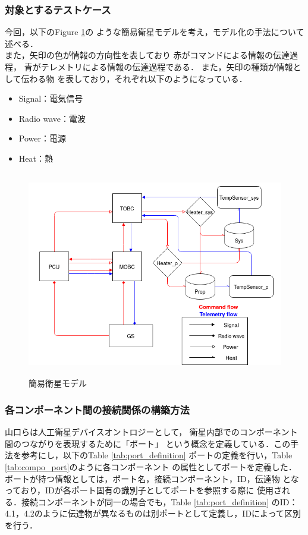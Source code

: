 \documentclass[11pt]{article}
\begin{document}
\subsubsection{対象とするテストケース}
今回，以下のFigure \ref{fig:simple_sat}の
ような簡易衛星モデルを考え，モデル化の手法について
述べる．\\
また，矢印の色が情報の方向性を表しており
赤がコマンドによる情報の伝達過程，
青がテレメトリによる情報の伝達過程である．
また，矢印の種類が情報として伝わる物
を表しており，それぞれ以下のようになっている．
\begin{itemize}
   \item Signal：電気信号
   \item Radio wave：電波
   \item Power：電源
   \item Heat：熱
\end{itemize}
\begin{figure}[H]
   \centering
      \includegraphics[height=9.0cm]{figure/simple_sat.png}
      \caption{簡易衛星モデル}
      \label{fig:simple_sat}
\end{figure}

\subsubsection{各コンポーネント間の接続関係の構築方法}
山口ら\cite{Yamaguchi2014}は人工衛星デバイスオントロジーとして，
衛星内部でのコンポーネント間のつながりを表現するために「ポート」
という概念を定義している．この手法を参考にし，以下のTable \ref{tab:port_definition}
ポートの定義を行い，Table \ref{tab:compo_port}のように各コンポーネント
の属性としてポートを定義した．\\
ポートが持つ情報としては，ポート名，接続コンポーネント，ID，伝達物
となっており，IDが各ポート固有の識別子としてポートを参照する際に
使用される．接続コンポーネントが同一の場合でも，Table \ref{tab:port_definition}
のID：4.1，4.2のように伝達物が異なるものは別ポートとして定義し，IDによって区別
を行う．
\end{document}
